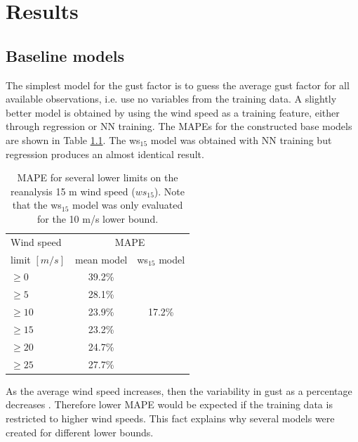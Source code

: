\chapter{Results}
\label{Chapter3}
\section{Baseline models}
The simplest model for the gust factor is to guess the average gust factor for all available observations, i.e. use no variables from the training data. A slightly better model is obtained by using the wind speed as a training feature, either through regression or NN training. The MAPEs for the constructed base models are shown in Table \ref{table:baseline_models}. The ws$_{15}$ model was obtained with NN training but regression produces an almost identical result.

\begin{table}[h]
  \caption[MAPE for baseline models]{MAPE for several lower limits on the reanalysis 15 m wind speed ($ws_{15}$). Note that the ws$_{15}$ model was only evaluated for the 10 m/s lower bound.}
    \label{table:baseline_models}
    \centering
    \begin{tabular}{lcc}
        \toprule
        Wind speed & \multicolumn{2}{c}{MAPE}\\ 
        limit $[m/s]$ & mean model & ws$_{15}$ model\\
        \midrule
        $\geq 0$ & 39.2\%  & \\
        $\geq 5$ & 28.1\%  & \\
        $\geq 10$ & 23.9\% & 17.2\%\\
        $\geq 15$ & 23.2\% & \\
        $\geq 20$ & 24.7\% & \\
        $\geq 25$ & 27.7\% & \\
        \bottomrule
    \end{tabular}
\end{table}

As the average wind speed increases, then the variability in gust as a percentage decreases \cite{mean_gust_HA_HO}. Therefore lower MAPE would be expected if the training data is restricted to higher wind speeds. This fact explains why several models were created for different lower bounds.

